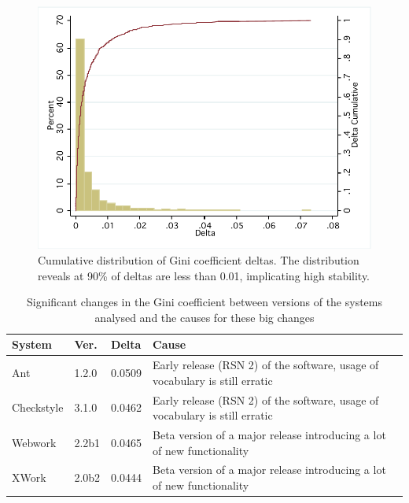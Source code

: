 \begin{figure}[t]
\centering
\includegraphics[width=\textwidth]{Figures/Vocab-GiniDeltaCumulFreq.pdf}
\caption{Cumulative distribution of Gini coefficient deltas. The distribution reveals at 90\% of deltas are less than 0.01, implicating high stability.}
\label{fig:vocab_gini_delta_cumul}
\end{figure}

\begin{table}[t]
\centering
\begin{tabular}{|p{}|p{}|p{}|p{}|}
\hline
{\bf System} & {\bf Ver.} & {\bf Delta} & {\bf Cause}\\
\hline
\hline
Ant
&
1.2.0
&
0.0509
&
Early release (RSN 2) of the software, usage of vocabulary is still erratic
\\
\hline
Checkstyle
&
3.1.0
&
0.0462
&
Early release (RSN 2) of the software, usage of vocabulary is still erratic
\\
\hline
Webwork
&
2.2b1
&
0.0465
&
Beta version of a major release introducing a lot of new functionality
\\
\hline
XWork
&
2.0b2
&
0.0444
&
Beta version of a major release introducing a lot of new functionality
\\
\hline
\end{tabular}
\vspace{0.2cm}
\caption{Significant changes in the Gini coefficient between versions of the systems analysed and the causes for these big changes}
\label{tab:outstanding_gini_deltas}
\vspace{-0.2cm}
\end{table}

